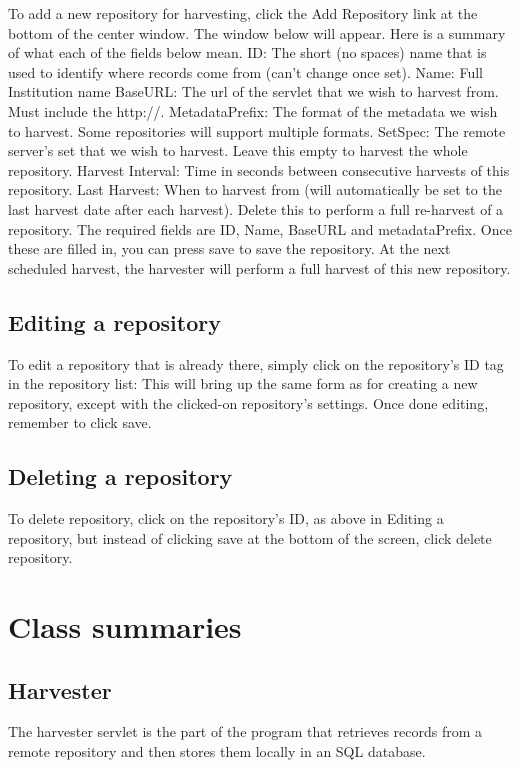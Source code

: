 \documentclass[a4paper,11pt]{article}
\begin{document}
To add a new repository for harvesting, click the Add Repository link at the bottom of the center window. The window below will appear. Here is a summary of what each of the fields below mean.
ID: The short (no spaces) name that is used to identify where records come from (can't change once set). Name: Full Institution name BaseURL: The url of the servlet that we wish to harvest from. Must include the http://. MetadataPrefix: The format of the metadata we wish to harvest. Some repositories will support multiple formats. SetSpec: The remote server's set that we wish to harvest. Leave this empty to harvest the whole repository. Harvest Interval: Time in seconds between consecutive harvests of this repository. Last Harvest: When to harvest from (will automatically be set to the last harvest date after each harvest). Delete this to perform a full re-harvest of a repository.
The required fields are ID, Name, BaseURL and metadataPrefix. Once these are filled in, you can press save to save the repository. At the next scheduled harvest, the harvester will perform a full harvest of this new repository.

\subsection{Editing a repository}

To edit a repository that is already there, simply click on the repository's ID tag in the repository list:
This will bring up the same form as for creating a new repository, except with the clicked-on repository's settings. Once done editing, remember to click save.

\subsection{Deleting a repository}

To delete repository, click on the repository's ID, as above in Editing a repository, but instead of clicking save at the bottom of the screen, click delete repository.

\section{Class summaries}

\subsection{Harvester}

The harvester servlet is the part of the program that retrieves records from a remote repository and then stores them locally in an SQL database.
\end{document}
